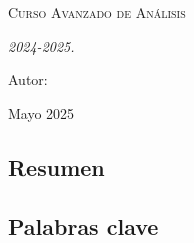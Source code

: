 \documentclass[12pt, a4paper]{article}
\theoremstyle{definition}
\begin{document}
\begin{titlepage}
    \centering
    \vspace{1cm}
    {\bfseries\LARGE \institution \par}
    \vspace{1cm}
    {\scshape\Large Curso Avanzado de Análisis \par}
    \vspace{3cm}
    {\scshape\Huge \projecttitle \par}
    \vspace{3cm}
    {\itshape\Large   
    2024-2025. \par}
    \vfill
    {\Large Autor: \par}
    {\Large \authorname \par}
    \vfill
    {\Large Mayo 2025 \par}
\end{titlepage}


\setlength{\parskip}{0.75em}
\renewcommand{\baselinestretch}{1.25}


\subsection*{Resumen}

\subsection*{Palabras clave}


\tableofcontents
\pagebreak


\pagebreak






\pagebreak




\end{document}
